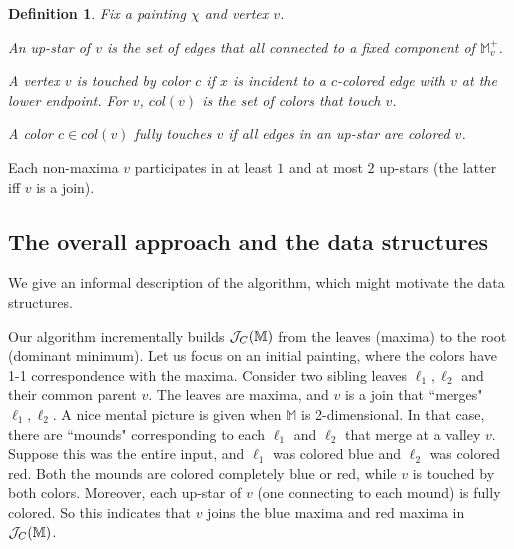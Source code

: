 \documentclass[11pt]{article}
\newcommand{\ignore}[1]{}
\newtheorem{definition}[theorem]{Definition}
\theoremstyle{definition}
\newcommand{\cJ}{{\cal J}}
\newcommand{\MM}{\mathbb{M}}
\newcommand{\eps}{\varepsilon}
\newcommand{\col}{col}
\newcommand{\fcol}{full}
\newcommand{\jc}{\cJ_C}
\begin{document}
\begin{definition} \label{def:color-set} Fix a painting $\chi$ and vertex $v$.
\begin{asparaitem}
	 \item An \emph{up-star} of $v$ is the set of edges that all connected to a fixed component of $\MM^+_v$.
	 \item A vertex $v$ is \emph{touched by color $c$} if $x$ is incident to a $c$-colored
	 edge with $v$ at the lower endpoint. For $v$, $\col(v)$ is the set of colors that touch $v$.
	 \item A color $c \in \col(v)$ \emph{fully touches} $v$ if all edges in an up-star are colored $v$.
\end{asparaitem}
\end{definition}

Each non-maxima $v$ participates in at least $1$ and at most $2$ up-stars (the latter iff
$v$ is a join).

\ignore{
Abusing notation, we say a contour $\phi$ is of color $c$ if all edges that intersect $\phi$ have color $c$.

\begin{definition} \label{def:color-full} Consider vertex $v$. An \emph{up-star} of $v$ is the set 
of edges that all connected to a fixed component of $\MM^+_v$. 
\end{definition}

Note that $\col(v)$ 
be initially determined in $O(|\MM|)$ time, by a simple linear scan.
}


\subsection{The overall approach and the data structures} \label{sec:struct}

We give an informal description of the algorithm, which might motivate the data structures.

Our algorithm incrementally builds $\jc(\MM)$ from the leaves (maxima) to the root (dominant minimum). 
Let us focus on an initial painting, where the colors have 1-1 correspondence with the maxima.
Consider two sibling leaves $\ell_1, \ell_2$ and their common parent $v$. The leaves are maxima,
and $v$ is a join that ``merges" $\ell_1, \ell_2$. A nice mental picture is given when $\MM$ is 2-dimensional.
In that case, there are ``mounds" corresponding to each $\ell_1$ and $\ell_2$ that merge
at a valley $v$. Suppose this was the entire input, and $\ell_1$ was colored blue and $\ell_2$ was colored red. 
Both the mounds are colored completely blue or red, while $v$ is touched by both colors.
Moreover, each up-star of $v$ (one connecting to each mound) is fully colored. So this
indicates that $v$ joins the blue maxima and red maxima in $\jc(\MM)$.
\end{document}
